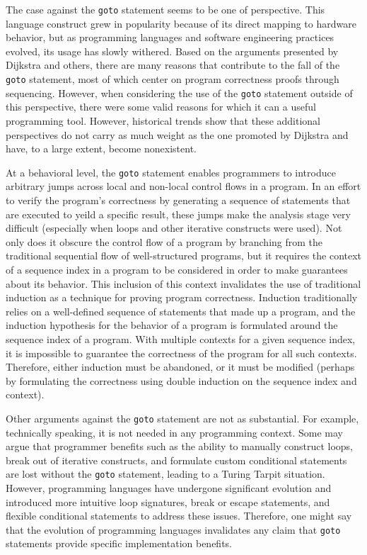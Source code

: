 \documentclass[12pt,letterpaper]{article}
\begin{document}
The case against the {\tt goto} statement seems to be one of perspective. This language construct 
grew in popularity because of its direct mapping to hardware behavior, but as programming languages
and software engineering practices evolved, its usage has slowly withered. Based on the arguments
presented by Dijkstra \cite{Dijkstra1968} and others, there are many reasons that contribute to the 
fall of the {\tt goto} statement, most of which center on program correctness proofs through sequencing. 
However, when considering the use of the {\tt goto} statement outside of this perspective, there were 
some valid reasons for which it can a useful programming tool. However, historical trends show that these 
additional perspectives do not carry as much weight as the one promoted by Dijkstra and have, to a large
extent, become nonexistent. 

At a behavioral level, the {\tt goto} statement enables programmers to introduce arbitrary jumps 
across local and non-local control flows in a program. In an effort to verify the program's correctness
by generating a sequence of statements that are executed to yeild a specific result, these jumps
make the analysis stage very difficult (especially when loops and other iterative constructs were used). 
Not only does it obscure the control flow of a program by 
branching from the traditional sequential flow of well-structured programs, but it requires the 
context of a sequence index in a program to be considered in order to make guarantees about its
behavior. This inclusion of this context invalidates the use of traditional induction as a 
technique for proving program correctness. Induction traditionally relies on a well-defined 
sequence of statements that made up a program, and the induction hypothesis for the behavior of a 
program is formulated around the sequence index of a program. With multiple contexts for a given 
sequence index, it is impossible to guarantee the correctness of the program for all such contexts.
Therefore, either induction must be abandoned, or it must be modified (perhaps by formulating the
correctness using double induction on the sequence index and context).

Other arguments against the {\tt goto} statement are not as substantial. For example, technically
speaking, it is not needed in any programming context. Some may argue that programmer benefits such as the 
ability to manually construct loops, break out of iterative constructs, and formulate 
custom conditional statements are lost without the {\tt goto} statement, leading to a Turing Tarpit
situation. However, programming languages have undergone significant evolution and introduced 
more intuitive loop signatures, break or escape statements, and flexible conditional statements
to address these issues. Therefore, one might say that the evolution of programming languages
invalidates any claim that {\tt goto} statements provide specific implementation benefits. 
\end{document}
